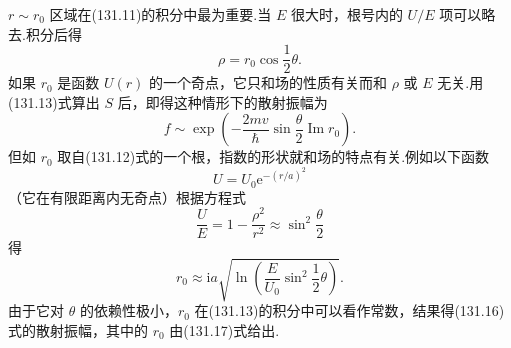 $r\sim r_0$ 区域在(131.11)的积分中最为重要.当 $E$ 很大时，根号内的 $U/E$ 项可以略去.积分后得
\begin{equation}
  \rho=r_0\cos\frac{1}{2}\theta.
\end{equation}
如果 $r_0$ 是函数 $U(r)$ 的一个奇点，它只和场的性质有关而和 $\rho$ 或 $E$ 无关.用(131.13)式算出 $S$ 后，即得这种情形下的散射振幅为
\begin{equation}
  f\sim\exp\left(-\frac{2mv}{\hbar}
  \sin\frac{\theta}{2}\operatorname{Im}r_0\right).
\end{equation}
但如 $r_0$ 取自(131.12)式的一个根，指数的形状就和场的特点有关.例如以下函数
\begin{equation*}
  U=U_0\mathrm{e}^{-(r/a)^2}
\end{equation*}
（它在有限距离内无奇点）根据方程式
\begin{equation*}
  \frac{U}{E}=1-\frac{\rho^2}{r^2}\approx\sin^2\frac{\theta}{2}
\end{equation*}
得
\begin{equation}
  r_0\approx\mathrm{i}a\sqrt{\ln\left(\frac{E}{U_0}\sin^2\frac{1}{2}\theta\right)}.
\end{equation}
由于它对 $\theta$ 的依赖性极小，$r_0$ 在(131.13)的积分中可以看作常数，结果得(131.16)式的散射振幅，其中的 $r_0$ 由(131.17)式给出.

